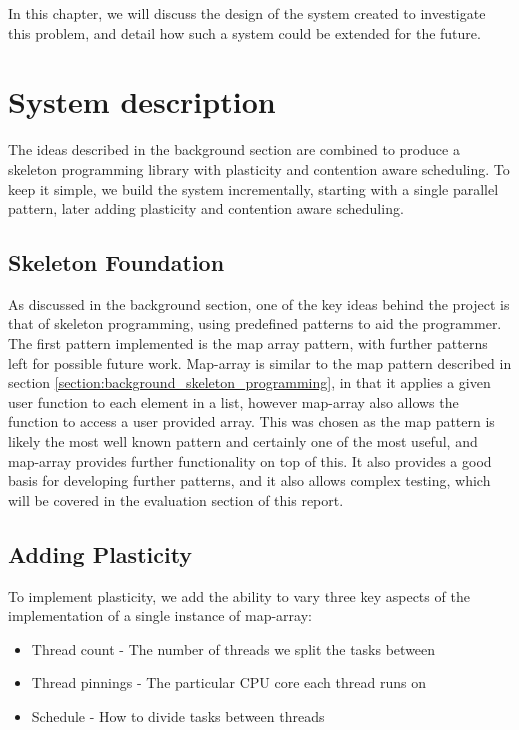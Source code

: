 
In this chapter, we will discuss the design of the system created to investigate this problem, and detail how such a system could be extended for the future.



\section{System description}

The ideas described in the background section are combined to produce a skeleton programming library with plasticity and contention aware scheduling. To keep it simple, we build the system incrementally, starting with a single parallel pattern, later adding plasticity and contention aware scheduling. 



\subsection{Skeleton Foundation}

As discussed in the background section, one of the key ideas behind the project is that of skeleton programming, using predefined patterns to aid the programmer. The first pattern implemented is the map array pattern, with further patterns left for possible future work. Map-array is similar to the map pattern described in section \ref{section:background_skeleton_programming}, in that it applies a given user function to each element in a list, however map-array also allows the function to access a user provided array. This was chosen as the map pattern is likely the most well known pattern and certainly one of the most useful, and map-array provides further functionality on top of this. It also provides a good basis for developing further patterns, and it also allows complex testing, which will be covered in the evaluation section of this report.



\subsection{Adding Plasticity}

To implement plasticity, we add the ability to vary three key aspects of the implementation of a single instance of map-array:

\begin{itemize}
	\item Thread count - The number of threads we split the tasks between
	\item Thread pinnings - The particular CPU core each thread runs on
	\item Schedule - How to divide tasks between threads
\end{itemize}

